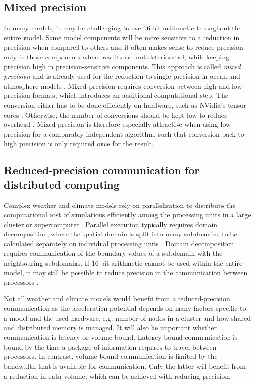 \subsection{Mixed precision}
\label{sec:swm_mixed}

In many models, it may be challenging to use 16-bit arithmetic throughout the entire model. Some model components
will be more sensitive to a reduction in precision when compared to others and it often makes sense to reduce precision only in
those components where results are not deteriorated, while keeping precision high in precision-sensitive components. This approach
is called \emph{mixed precision} and is already used for the reduction to single precision in ocean and atmosphere models 
\citep{Vana2017,TintoPrims2019}. Mixed precision requires conversion between high and low-precision formats, which introduces
an additional computational step. The conversion either has to be done efficiently on hardware, such as NVidia's tensor cores
\citep{Hatfield2019,Haidar2018}. Otherwise, the number of conversions should be kept low to reduce overhead \citep{Higham2019}.
Mixed precision is therefore especially attractive when using low precision for a comparably independent algorithm, such that
conversion back to high precision is only required once for the result.

\subsection{Reduced-precision communication for distributed computing}
\label{sec:swm_comm}

Complex weather and climate models rely on parallelisation to distribute the computational cost of simulations efficiently among
the processing units in a large cluster or supercomputer \citep{Fuhrer2018}. Parallel execution typically requires domain
decomposition, where the spatial domain is split into many subdomains to be calculated separately on individual processing units
\citep{Chan1994,Toselli2004}. Domain decomposition requires communication of the boundary values of a subdomain with the
neighbouring subdomains. If 16-bit arithmetic cannot be used within the entire model, it may still be possible to reduce precision
in the communication between processors \citep{Fan2019}.

Not all weather and climate models would benefit from a reduced-precision communication as the acceleration potential depends
on many factors specific to a model and the used hardware, e.g. number of nodes in a cluster and how shared and distributed
memory is managed. It will also be important whether communication is latency or volume bound. Latency bound communication
is bound by the time a package of information requires to travel between processors. In contrast, volume bound communication
is limited by the bandwidth that is available for communication. Only the latter will benefit from a reduction in data volume, which
can be achieved with reducing precision.

